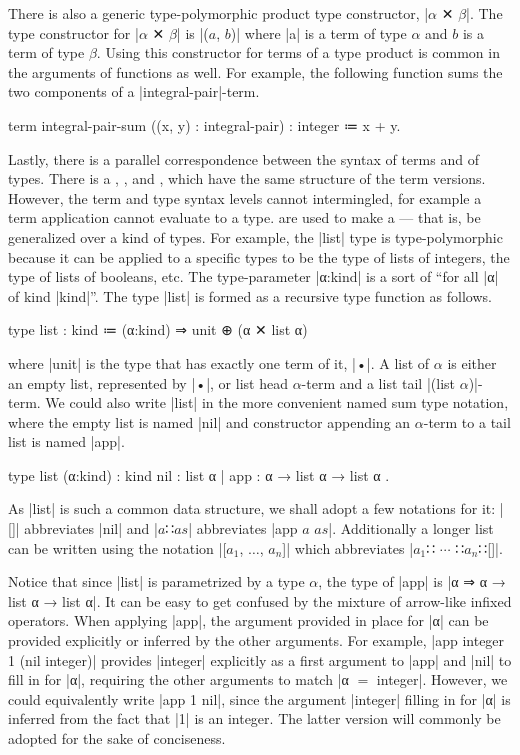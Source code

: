 There is also a generic type-polymorphic product type constructor, \code|$α$ ✕ $β$|.
The type constructor for \code|$α$ ✕ $β$| is \code|($a$, $b$)| where \code|a| is a term of type $α$ and $b$ is a term of type $β$.
Using this constructor for terms of a type product is common in the arguments of functions as well.
For example, the following function sums the two components of a \code|integral-pair|-term.
%
\begin{snippet}
term integral-pair-sum ((x, y) : integral-pair) : integer ≔ x + y.
\end{snippet}
%

Lastly, there is a parallel correspondence between the syntax of terms and of types.
There is a , , and , which have the same structure of the term versions.
However, the term and type syntax levels cannot intermingled, for example a term application cannot evaluate to a type.
 are used to make a  --- that is, be generalized over a kind of types.
For example, the \code|list| type is type-polymorphic because it can be applied to a specific types to be the type of lists of integers, the type of lists of booleans, etc.
The type-parameter \code|α:kind| is a sort of ``for all \code|α| of kind \code|kind|''.
The type \code|list| is formed as a recursive type function as follows.
%
\begin{snippet}
type list : kind ≔ (α:kind) ⇒ unit ⊕ (α ✕ list α)
\end{snippet}
%
where \code|unit| is the type that has exactly one term of it, \code|•|.
A list of $α$ is either an empty list, represented by \code|•|, or list head $α$-term and a list tail \code|(list $α$)|-term.
We could also write \code|list| in the more convenient named sum type notation, where the empty list is named \code|nil| and constructor appending an $α$-term to a tail list is named \code|app|.
%
\begin{snippet}
type list (α:kind) : kind
  { nil : list α
  | app : α → list α → list α }.
\end{snippet}
%
As \code|list| is such a common data structure, we shall adopt a few notations for it: \code|[]| abbreviates \code|nil| and \code|$a$∷$as$| abbreviates \code|app $a$ $as$|.
Additionally a longer list can be written using the notation \code|[$a_1$, $\dots$, $a_n$]| which abbreviates \code|$a_1$∷ $\cdots$ ∷$a_n$∷[]|.

Notice that since \code|list| is parametrized by a type $α$, the type of \code|app| is \code|α ⇒ α → list α → list α|.
It can be easy to get confused by the mixture of arrow-like infixed operators.
When applying \code|app|, the argument provided in place for \code|α| can be provided explicitly or inferred by the other arguments.
For example, \code|app integer 1 (nil integer)| provides \code|integer| explicitly as a first argument to \code|app| and \code|nil| to fill in for \code|α|, requiring the other arguments to match \code|α $=$ integer|.
However, we could equivalently write \code|app 1 nil|, since the argument \code|integer| filling in for \code|α| is inferred from the fact that \code|1| is an integer.
The latter version will commonly be adopted for the sake of conciseness.


